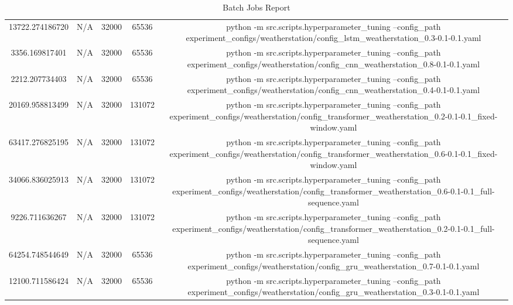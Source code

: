 \begin{table}[h]
\begin{tabular}{c | c | c | c | c}
13722.274186720 & N/A & 32000 & 65536 & python -m src.scripts.hyperparameter_tuning --config_path experiment_configs/weatherstation/config_lstm_weatherstation_0.3-0.1-0.1.yaml \\
3356.169817401 & N/A & 32000 & 65536 & python -m src.scripts.hyperparameter_tuning --config_path experiment_configs/weatherstation/config_cnn_weatherstation_0.8-0.1-0.1.yaml \\
2212.207734403 & N/A & 32000 & 65536 & python -m src.scripts.hyperparameter_tuning --config_path experiment_configs/weatherstation/config_cnn_weatherstation_0.4-0.1-0.1.yaml \\
20169.958813499 & N/A & 32000 & 131072 & python -m src.scripts.hyperparameter_tuning --config_path experiment_configs/weatherstation/config_transformer_weatherstation_0.2-0.1-0.1_fixed-window.yaml \\
63417.276825195 & N/A & 32000 & 131072 & python -m src.scripts.hyperparameter_tuning --config_path experiment_configs/weatherstation/config_transformer_weatherstation_0.6-0.1-0.1_fixed-window.yaml \\
34066.836025913 & N/A & 32000 & 131072 & python -m src.scripts.hyperparameter_tuning --config_path experiment_configs/weatherstation/config_transformer_weatherstation_0.6-0.1-0.1_full-sequence.yaml \\
9226.711636267 & N/A & 32000 & 131072 & python -m src.scripts.hyperparameter_tuning --config_path experiment_configs/weatherstation/config_transformer_weatherstation_0.2-0.1-0.1_full-sequence.yaml \\
64254.748544649 & N/A & 32000 & 65536 & python -m src.scripts.hyperparameter_tuning --config_path experiment_configs/weatherstation/config_gru_weatherstation_0.7-0.1-0.1.yaml \\
12100.711586424 & N/A & 32000 & 65536 & python -m src.scripts.hyperparameter_tuning --config_path experiment_configs/weatherstation/config_gru_weatherstation_0.3-0.1-0.1.yaml \\
\hline
\end{tabular}
\caption{Batch Jobs Report}
\label{tab:batch_jobs_report}
\end{table}
